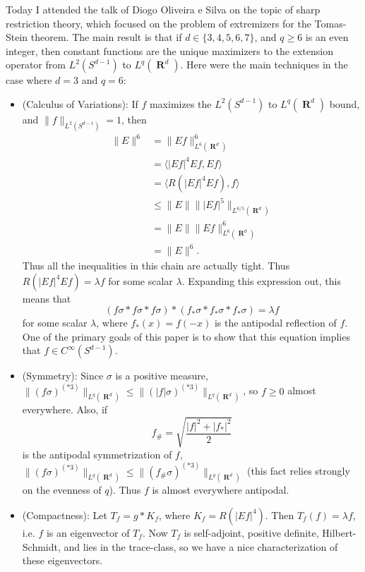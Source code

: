\documentclass[openany,nobib,nols,a4paper,twoside,symmetric,justified,notoc]{tufte-book}
\theoremstyle{plain}
\theoremstyle{remark}
\theoremstyle{definition}
\DeclareMathOperator{\RR}{\mathbf{R}}
\begin{document}
Today I attended the talk of Diogo Oliveira e Silva on the topic of sharp restriction theory, which focused on the problem of extremizers for the Tomas-Stein theorem. The main result is that if $d \in \{ 3, 4, 5, 6, 7 \}$, and $q \geq 6$ is an even integer, then constant functions are the unique maximizers to the extension operator from $L^2(S^{d-1})$ to $L^q(\RR^d)$. Here were the main techniques in the case where $d = 3$ and $q = 6$:
%
\begin{itemize}
    \item (Calculus of Variations): If $f$ maximizes the $L^2(S^{d-1})$ to $L^q(\RR^d)$ bound, and $\| f \|_{L^2(S^{d-1})} = 1$, then
    \begin{align*}
        \| E \|^6 &= \| Ef \|_{L^6(\RR^d)}^6\\
        &= \langle |Ef|^4 Ef, Ef \rangle\\
        &= \langle R(|Ef|^4 Ef), f \rangle\\
        &\leq \| E \| \| |Ef|^5 \|_{L^{6/5}(\RR^d)}\\
        &= \| E \| \| Ef \|_{L^6(\RR^d)}^6\\
        &= \| E \|^6.
    \end{align*}
    Thus all the inequalities in this chain are actually tight. Thus $R(|Ef|^4 Ef) = \lambda f$ for some scalar $\lambda$. Expanding this expression out, this means that
    \[ (f\sigma * f\sigma * f\sigma) * (f_* \sigma * f_* \sigma * f_* \sigma) = \lambda f \]
    for some scalar $\lambda$, where $f_*(x) = f(-x)$ is the antipodal reflection of $f$. One of the primary goals of this paper is to show that this equation implies that $f \in C^\infty(S^{d-1})$.

    \item (Symmetry): Since $\sigma$ is a positive measure, $\| (f\sigma)^{(* 3)} \|_{L^q(\RR^d)} \leq \| (|f| \sigma)^{(* 3)} \|_{L^q(\RR^d)}$, so $f \geq 0$ almost everywhere. Also, if
    \[ f_{\#} = \sqrt{\frac{|f|^2 + |f_*|^2}{2}} \]
    is the antipodal symmetrization of $f$, $\| (f \sigma)^{(* 3)} \|_{L^q(\RR^d)} \leq \| (f_\# \sigma)^{(* 3)} \|_{L^q(\RR^d)}$ (this fact relies strongly on the evenness of $q$). Thus $f$ is almost everywhere antipodal.

    \item (Compactness): Let $T_f = g * K_f$, where $K_f = R(|Ef|^4)$. Then $T_f(f) = \lambda f$, i.e. $f$ is an eigenvector of $T_f$. Now $T_f$ is self-adjoint, positive definite, Hilbert-Schmidt, and lies in the trace-class, so we have a nice characterization of these eigenvectors.


\end{itemize}
\end{document}
